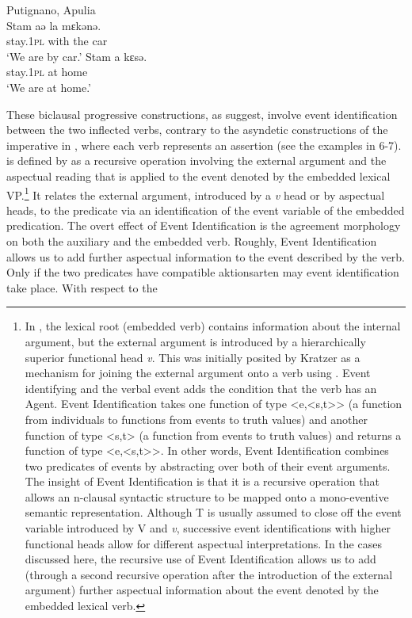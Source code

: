 \documentclass[output=paper]{langsci/langscibook}
\begin{document}
\ea%
    Putignano, Apulia\label{ex:lorusso:37}\\
    \ea
    \gll Stam    aə  la  mɛkənə.\\
         stay.\textsc{1pl}   with  the  car\\
    \glt ‘We are by car.’
    \ex
    \gll Stam     a   kɛsə.\\
         stay.\textsc{1pl}   at  home \\
    \glt ‘We are at home.’
    \z
\z

These biclausal progressive constructions, as \citet{Manzini2005} suggest, involve event identification between the two inflected verbs, contrary to the asyndetic constructions of the imperative in  \citep{Ledgeway1997}, where each verb represents an assertion (see the examples in 6-7).  is defined by \citet{Kratzer1996} as a recursive operation involving the external argument and the aspectual reading that is applied to the event denoted by the embedded lexical VP.\footnote{In \citet{Kratzer1996}, the lexical root (embedded verb) contains information about the internal argument, but the external argument is introduced by a hierarchically superior functional head \textit{v}. This was initially posited by Kratzer as a mechanism for joining the external argument onto a verb using . Event identifying  and the verbal event adds the condition that the verb has an Agent. Event Identification takes one function of type <e,<s,t{>}{>} (a function from individuals to functions from events to truth values) and another function of type <s,t> (a function from events to truth values) and returns a function of type <e,<s,t{>}{>}. In other words, Event Identification combines two predicates of events by abstracting over both of their event arguments. The insight of  Event Identification is that it is a recursive operation that allows an n-clausal syntactic structure to be mapped onto a mono-eventive semantic representation. Although T is usually assumed to close off the event variable introduced by V and \textit{v}, successive event identifications with higher functional heads allow for different aspectual interpretations. In the cases discussed here, the recursive use of Event Identification allows us to add (through a second recursive operation after the introduction of the external argument) further aspectual information about the event denoted by the embedded lexical verb.} It relates the external argument, introduced by a \textit{v} head or by aspectual heads, to the predicate via an identification of the event variable of the embedded predication. The overt effect of Event Identification is the agreement morphology on both the auxiliary and the embedded verb. Roughly, Event Identification allows us to add further aspectual information to the event described by the verb. Only if the two predicates have compatible aktionsarten may event identification take place. With respect to the 
\end{document}
